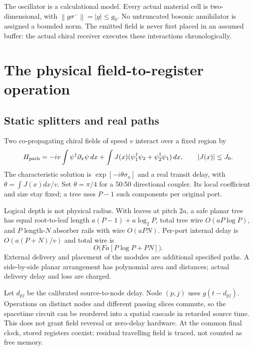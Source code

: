 \documentclass[11pt,a4paper]{article}
\newcommand{\norm}[1]{\left\lVert #1\right\rVert}\newcommand{\ket}[1]{\lvert #1\rangle}\newcommand{\bra}[1]{\langle #1\rvert}
\begin{document}
The oscillator is a calculational model. Every actual material cell is two-dimensional, with $\norm{g\sigma^-}=|g|\le g_0$. No untruncated bosonic annihilator is assigned a bounded norm. The emitted field is never first placed in an assumed buffer: the actual chiral receiver executes these interactions chronologically.

\section{The physical field-to-register operation}
\label{sec:map}

\subsection{Static splitters and real paths}

Two co-propagating chiral fields of speed $v$ interact over a fixed region by
\begin{equation}
 H_{\rm path}=-iv\int\psi^\dagger\partial_x\psi\,dx
 +\int J(x)(\psi_1^\dagger\psi_2+\psi_2^\dagger\psi_1)\,dx,
 \qquad |J(x)|\le J_0.
\end{equation}
The characteristic solution is $\exp[-i\theta\sigma_x]$ and a real transit delay, with $\theta=\int J(x)dx/v$. Set $\theta=\pi/4$ for a 50:50 directional coupler. Its local coefficient and size stay fixed; a tree uses $P-1$ such components per original port.

Logical depth is not physical radius. With leaves at pitch $2a$, a safe planar tree has equal root-to-leaf length $a(P-1)+a\log_2P$, total tree wire $O(aP\log P)$, and $P$ length-$N$ absorber rails with wire $O(aPN)$. Per-port internal delay is $O(a(P+N)/v)$ and total wire is
\begin{equation}
 O\bigl(Fa[P\log P+PN]\bigr).
\end{equation}
External delivery and placement of the modules are additional specified paths. A side-by-side planar arrangement has polynomial area and distances; actual delivery delay and loss are charged.

Let $d_{pj}$ be the calibrated source-to-node delay. Node $(p,j)$ uses $g(t-d_{pj})$. Operations on distinct nodes and different passing slices commute, so the spacetime circuit can be reordered into a spatial cascade in retarded source time. This does not grant field reversal or zero-delay hardware. At the common final clock, stored registers coexist; residual travelling field is traced, not counted as free memory.
\end{document}
